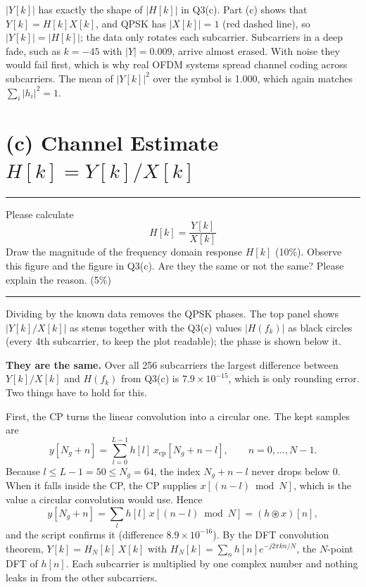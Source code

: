 \documentclass[12pt,a4paper]{report}
\newcommand{\question}[1]{%
    \hrule
    \vspace{0.2cm}
    #1
    \vspace{0.2cm}
    \hrule
    \vspace{0.5cm}
}
\begin{document}
$|Y[k]|$ has exactly the shape of $|H[k]|$ in Q3(c). Part (c) shows that $Y[k] = H[k]X[k]$, and QPSK has
$|X[k]| = 1$ (red dashed line), so $|Y[k]| = |H[k]|$; the data only rotates each subcarrier. Subcarriers in a deep
fade, such as $k = -45$ with $|Y| = 0.009$, arrive almost erased. With noise they would fail first, which is why real
OFDM systems spread channel coding across subcarriers. The mean of $|Y[k]|^2$ over the symbol is 1.000, which again
matches $\sum_i |h_i|^2 = 1$.

\newpage

\section{(c) Channel Estimate $H[k] = Y[k]/X[k]$}

\question{Please calculate
\[ H[k] = \frac{Y[k]}{X[k]} \]
Draw the magnitude of the frequency domain response $H[k]$ (10\%). Observe this figure and the figure in Q3(c). Are
they the same or not the same? Please explain the reason. (5\%)}

Dividing by the known data removes the QPSK phases. The top panel shows $|Y[k]/X[k]|$ as stems together with the
Q3(c) values $|H(f_k)|$ as black circles (every 4th subcarrier, to keep the plot readable); the phase is shown below it.

\textbf{They are the same.} Over all 256 subcarriers the largest difference between $Y[k]/X[k]$ and $H(f_k)$ from
Q3(c) is $7.9 \times 10^{-15}$, which is only rounding error. Two things have to hold for this.

First, the CP turns the linear convolution into a circular one. The kept samples are
\begin{equation}
    y[N_g + n] = \sum_{l=0}^{L-1} h[l]\,x_{\mathrm{cp}}[N_g + n - l], \qquad n = 0, \ldots, N-1 .
\end{equation}
Because $l \le L - 1 = 50 \le N_g = 64$, the index $N_g + n - l$ never drops below 0. When it falls inside the CP, the
CP supplies $x[(n - l) \bmod N]$, which is the value a circular convolution would use. Hence
\begin{equation}
    y[N_g + n] = \sum_{l} h[l]\,x[(n - l) \bmod N] = (h \circledast x)[n],
\end{equation}
and the script confirms it (difference $8.9 \times 10^{-16}$). By the DFT convolution theorem,
$Y[k] = H_N[k]\,X[k]$ with $H_N[k] = \sum_n h[n] e^{-j2\pi kn/N}$, the $N$-point DFT of $h[n]$. Each subcarrier is
multiplied by one complex number and nothing leaks in from the other subcarriers.
\end{document}
